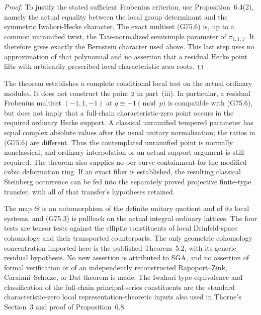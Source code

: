\begin{proof}
To justify the stated sufficient Frobenius criterion, use
Proposition~6.4(2), namely the actual equality between the local
group determinant and the symmetric Iwahori-Hecke character.
The exact multiset (G75.6) is, up to a common unramified twist, the
Tate-normalized semisimple parameter of \(\pi_{1,1,1}\).
It therefore gives exactly the Bernstein character used above.
This last step uses no approximation of that polynomial and no
assertion that a residual Hecke point lifts with arbitrarily
prescribed local characteristic-zero roots.
\end{proof}

\begin{remark}
\label{rem:G75-scope}
The theorem establishes a complete conditional local test on the
actual ordinary modules.  It does not construct the point
\(\mathfrak p\) in part~(iii).
In particular, a residual Frobenius multiset
\((-1,1,-1)\) at \(q\equiv-1\pmod p\) is compatible with (G75.6),
but does not imply that a full-chain characteristic-zero point
occurs in the required ordinary Hecke support.
A classical unramified tempered parameter has equal complex
absolute values after the usual unitary normalization; the ratios
in (G75.6) are different.  Thus the contemplated unramified point
is normally nonclassical, and ordinary interpolation or an actual
support argument is still required.
The theorem also supplies no per-curve containment for the
modified cubic deformation ring.
If an exact fiber is established, the resulting classical
Steinberg occurrence can be fed into the separately proved
projective finite-type transfer, with all of that transfer's
hypotheses retained.
\end{remark}

\begin{remark}
The map \(\Theta\) is an automorphism of the definite unitary
quotient and of its local systems, and (G75.3) is pullback on the
actual integral ordinary lattices.  The four tests are tensor
tests against the elliptic constituents of local
Drinfeld-space cohomology and their transported counterparts.
The only geometric cohomology concentration imported here is the
published Theorem~5.2, with its generic residual hypothesis.
No new assertion is attributed to SGA, and no assertion of
formal verification or of an independently reconstructed
Rapoport--Zink, Caraiani--Scholze, or Dat theorem is made.
The Iwahori type equivalence and classification of the
full-chain principal-series constituents are the standard
characteristic-zero local representation-theoretic inputs also
used in Thorne's Section~3 and proof of Proposition~6.8.
\end{remark}
